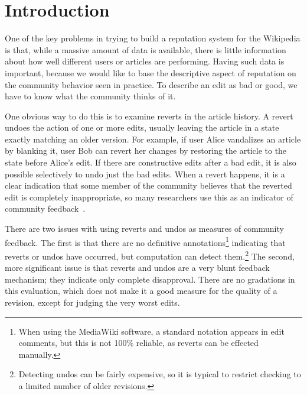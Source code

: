 \section{Introduction}

One of the key problems in trying to build a reputation system
for the Wikipedia is that, while a massive amount of
data is available, there is little information about how well different
users or articles are performing.
Having such data is important, because we would like to base the
descriptive aspect of reputation on the community behavior seen
in practice.
To describe an edit as bad or good, we have to know what the
community thinks of it.

One obvious way to do this is to examine reverts
in the article history.
A revert undoes the action of one or more edits, usually leaving
the article in a state exactly matching an older version.
For example, if user Alice vandalizes an article by blanking it,
user Bob can revert her changes by restoring the article to the
state before Alice's edit.
If there are constructive edits after a bad edit, it is also possible
selectively to undo just the bad edits.
When a revert happens, it is a clear indication that some member
of the community believes that the reverted edit is completely
inappropriate, so many researchers use this as an indicator of
community feedback~\cite{Adler2007,Smets2008,Itakura2009,Belani2010}.

There are two issues with using reverts and undos
as measures of community feedback.
The first is that there are no definitive
annotations\footnote{When using the MediaWiki software,
a standard notation appears in edit comments,
but this is not 100\% reliable, as reverts can be effected manually.}
indicating that reverts or undos have occurred,
but computation can detect
them.\footnote{Detecting undos can be fairly expensive, so
it is typical to restrict checking to a limited number of older revisions.}
The second, more significant issue is that reverts and undos
are a very blunt feedback mechanism; they indicate only complete disapproval.
There are no gradations in this evaluation, which does not make
it a good measure for the quality of a revision, except for judging the very
worst edits.

